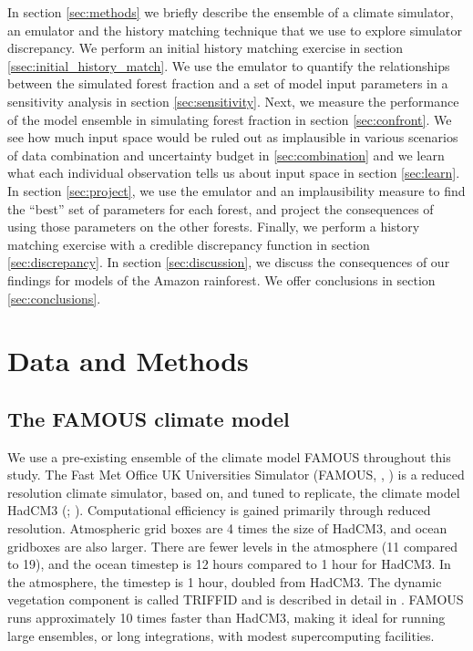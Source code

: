 \documentclass[esd, manuscript]{copernicus}
\begin{document}
In section \ref{sec:methods} we briefly describe the ensemble of a climate simulator, an emulator and the history matching technique that we use to explore simulator discrepancy. We perform an initial history matching exercise in section \ref{ssec:initial_history_match}. We use the emulator to quantify the relationships between the simulated forest fraction and a set of model input parameters in a sensitivity analysis in section \ref{sec:sensitivity}. Next, we measure the performance of the model ensemble in simulating forest fraction in section \ref{sec:confront}. We see how much input space would be ruled out as implausible in various scenarios of data combination and uncertainty budget in \ref{sec:combination} and we learn what each individual observation tells us about input space in section \ref{sec:learn}. In section \ref{sec:project}, we use the emulator and an implausibility measure to find the “best” set of parameters for each forest, and project the consequences of using those parameters on the other forests. Finally, we perform a history matching exercise with a credible discrepancy function in section \ref{sec:discrepancy}. In section \ref{sec:discussion}, we discuss the consequences of our findings for models of the Amazon rainforest. We offer conclusions in section \ref{sec:conclusions}.


\section{Data and Methods}\label{sec:dataandmethods}

\subsection{The FAMOUS climate model}\label{subsec:FAMOUS}

We use a pre-existing ensemble of the climate model FAMOUS throughout this study. The Fast Met Office UK Universities Simulator (FAMOUS, \citep{jones2005systematic}, \citep{smith2008famous}) is a reduced resolution climate simulator, based on, and tuned to replicate, the climate model HadCM3 (\citep{gordon2000simulation}; \citep{pope2000impact}). Computational efficiency is gained primarily through reduced resolution. Atmospheric grid boxes are 4 times the size of HadCM3, and ocean gridboxes are also larger. There are fewer levels in the atmosphere (11 compared to 19), and the ocean timestep is 12 hours compared to 1 hour for HadCM3. In the atmosphere, the timestep is 1 hour, doubled from HadCM3. The dynamic vegetation component is called TRIFFID and is described in detail in \citep{cox2001description}.  FAMOUS runs approximately 10 times faster than HadCM3, making it ideal for running large ensembles, or long integrations, with modest supercomputing facilities.
\end{document}
